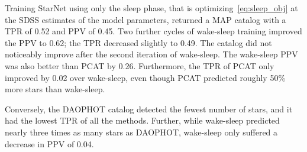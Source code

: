 Training StarNet using only the sleep phase, that is optimizing~\eqref{eq:sleep_obj} at the SDSS estimates of the model parameters, returned 
a MAP catalog with a TPR of 0.52 and PPV of 0.45. Two further cycles of wake-sleep training improved the PPV to 0.62; the TPR decreased slightly to 0.49. The catalog did not noticeably improve after the second iteration of wake-sleep. The wake-sleep PPV was also better than PCAT by 0.26. Furthermore, the TPR of PCAT
only improved by 0.02 over wake-sleep, even though PCAT predicted roughly 50\% more stars than wake-sleep. 





Conversely, the DAOPHOT catalog detected the fewest number of stars, and it had the lowest TPR of all the methods.
Further, while wake-sleep predicted nearly three times as many stars as DAOPHOT, wake-sleep only suffered a decrease in PPV of 0.04. 





